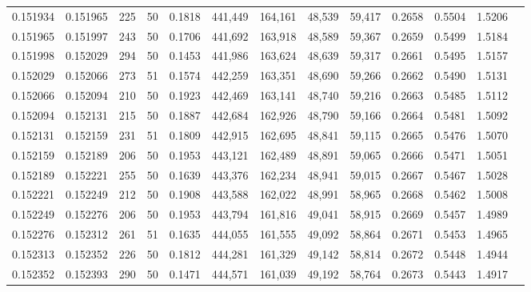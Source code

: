 \begin{tabular}{rrrrrrrrrrrrr}
0.151934 & 0.151965 &   225 &  50 &                                     0.1818 & 441,449 & 164,161 &  48,539 &  59,417 & 0.2658 & 0.5504 & 1.5206 \\
0.151965 & 0.151997 &   243 &  50 &                                     0.1706 & 441,692 & 163,918 &  48,589 &  59,367 & 0.2659 & 0.5499 & 1.5184 \\
0.151998 & 0.152029 &   294 &  50 &                                     0.1453 & 441,986 & 163,624 &  48,639 &  59,317 & 0.2661 & 0.5495 & 1.5157 \\
0.152029 & 0.152066 &   273 &  51 &                                     0.1574 & 442,259 & 163,351 &  48,690 &  59,266 & 0.2662 & 0.5490 & 1.5131 \\
0.152066 & 0.152094 &   210 &  50 &                                     0.1923 & 442,469 & 163,141 &  48,740 &  59,216 & 0.2663 & 0.5485 & 1.5112 \\
0.152094 & 0.152131 &   215 &  50 &                                     0.1887 & 442,684 & 162,926 &  48,790 &  59,166 & 0.2664 & 0.5481 & 1.5092 \\
0.152131 & 0.152159 &   231 &  51 &                                     0.1809 & 442,915 & 162,695 &  48,841 &  59,115 & 0.2665 & 0.5476 & 1.5070 \\
0.152159 & 0.152189 &   206 &  50 &                                     0.1953 & 443,121 & 162,489 &  48,891 &  59,065 & 0.2666 & 0.5471 & 1.5051 \\
0.152189 & 0.152221 &   255 &  50 &                                     0.1639 & 443,376 & 162,234 &  48,941 &  59,015 & 0.2667 & 0.5467 & 1.5028 \\
0.152221 & 0.152249 &   212 &  50 &                                     0.1908 & 443,588 & 162,022 &  48,991 &  58,965 & 0.2668 & 0.5462 & 1.5008 \\
0.152249 & 0.152276 &   206 &  50 &                                     0.1953 & 443,794 & 161,816 &  49,041 &  58,915 & 0.2669 & 0.5457 & 1.4989 \\
0.152276 & 0.152312 &   261 &  51 &                                     0.1635 & 444,055 & 161,555 &  49,092 &  58,864 & 0.2671 & 0.5453 & 1.4965 \\
0.152313 & 0.152352 &   226 &  50 &                                     0.1812 & 444,281 & 161,329 &  49,142 &  58,814 & 0.2672 & 0.5448 & 1.4944 \\
0.152352 & 0.152393 &   290 &  50 &                                     0.1471 & 444,571 & 161,039 &  49,192 &  58,764 & 0.2673 & 0.5443 & 1.4917 \\

\end{tabular}
